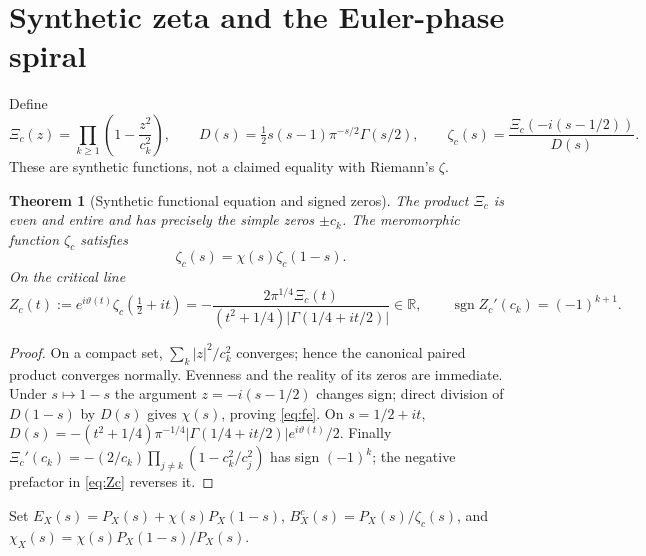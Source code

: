 \documentclass[11pt,a4paper]{article}
\numberwithin{equation}{section}
\newtheorem{theorem}{Theorem}[section]
\newcommand{\R}{\mathbb R}
\newcommand{\sgn}{\operatorname{sgn}}
\begin{document}
\section{Synthetic zeta and the Euler-phase spiral}
Define
\begin{equation}\label{eq:synthetic}
\Xi_c(z)=\prod_{k\ge1}\left(1-\frac{z^2}{c_k^2}\right),\qquad
D(s)=\tfrac12s(s-1)\pi^{-s/2}\Gamma(s/2),\qquad
\zeta_c(s)=\frac{\Xi_c(-i(s-1/2))}{D(s)}.
\end{equation}
These are synthetic functions, not a claimed equality with Riemann's $\zeta$.
\begin{theorem}[Synthetic functional equation and signed zeros]\label{thm:func}
The product $\Xi_c$ is even and entire and has precisely the simple zeros $\pm c_k$. The meromorphic function $\zeta_c$ satisfies
\begin{equation}\label{eq:fe}
\zeta_c(s)=\chi(s)\zeta_c(1-s).
\end{equation}
On the critical line
\begin{equation}\label{eq:Zc}
Z_c(t):=e^{i\vartheta(t)}\zeta_c(\tfrac12+it)
=-\frac{2\pi^{1/4}\Xi_c(t)}{(t^2+1/4)|\Gamma(1/4+it/2)|}\in\R,
\qquad \sgn Z_c'(c_k)=(-1)^{k+1}.
\end{equation}
\end{theorem}
\begin{proof}
On a compact set, $\sum_k |z|^2/c_k^2$ converges; hence the canonical paired product converges normally. Evenness and the reality of its zeros are immediate. Under $s\mapsto1-s$ the argument $z=-i(s-1/2)$ changes sign; direct division of $D(1-s)$ by $D(s)$ gives $\chi(s)$, proving \eqref{eq:fe}. On $s=1/2+it$, $D(s)=-(t^2+1/4)\pi^{-1/4}|\Gamma(1/4+it/2)|e^{i\vartheta(t)}/2$. Finally $\Xi_c'(c_k)=-(2/c_k)\prod_{j\ne k}(1-c_k^2/c_j^2)$ has sign $(-1)^k$; the negative prefactor in \eqref{eq:Zc} reverses it.
\end{proof}
Set $E_X(s)=P_X(s)+\chi(s)P_X(1-s)$, $B_X^c(s)=P_X(s)/\zeta_c(s)$, and $\chi_X(s)=\chi(s)P_X(1-s)/P_X(s)$.
\end{document}
